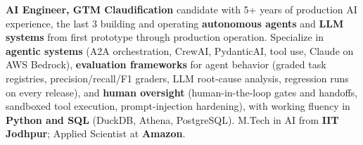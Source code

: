 \documentclass[letter,10pt]{article}
\begin{document}

\textbf{AI Engineer, GTM Claudification} candidate with 5+ years of production AI experience, the last 3 building and operating \textbf{autonomous agents} and \textbf{LLM systems} from first prototype through production operation.
Specialize in \textbf{agentic systems} (A2A orchestration, CrewAI, PydanticAI, tool use, Claude on AWS Bedrock), \textbf{evaluation frameworks} for agent behavior (graded task registries, precision/recall/F1 graders, LLM root-cause analysis, regression runs on every release), and \textbf{human oversight} (human-in-the-loop gates and handoffs, sandboxed tool execution, prompt-injection hardening), with working fluency in \textbf{Python and SQL} (DuckDB, Athena, PostgreSQL).
M.Tech in AI from \textbf{IIT Jodhpur}; Applied Scientist at \textbf{Amazon}.
\end{document}
